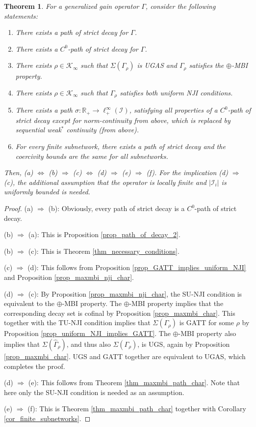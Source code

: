 \documentclass[10pt, oneside, a4paper]{article}
\newcommand{\R}{\mathbb{R}}
\newcommand{\IC}{\mathcal{I}}
\newcommand{\KC}{\mathcal{K}}
\newtheorem{theorem}{Theorem}[section]
\begin{document}
\begin{theorem}\label{thm_final}
For a generalized gain operator $\Gamma$, consider the following statements:%
\begin{enumerate}
\item[(a)] There exists a path of strict decay for $\Gamma$.%
\item[(b)] There exists a $C^0$-path of strict decay for $\Gamma$.%
\item[(c)] There exists $\rho \in \KC_{\infty}$ such that $\Sigma(\Gamma_{\rho})$ is UGAS and $\Gamma_{\rho}$ satisfies the $\oplus$-MBI property.%
\item[(d)] There exists $\rho \in \KC_{\infty}$ such that $\Gamma_{\rho}$ satisfies both uniform NJI conditions.%
\item[(e)] There exists a path $\sigma:\R_+ \rightarrow \ell^{\infty}_+(\IC)$, satisfying all properties of a $C^0$-path of strict decay except for norm-continuity from above, which is replaced by sequential weak$^*$ continuity (from above).%
\item[(f)] For every finite subnetwork, there exists a path of strict decay and the coercivity bounds are the same for all subnetworks.%
\end{enumerate}
Then, (a) $\Leftrightarrow$ (b) $\Rightarrow$ (c) $\Leftrightarrow$ (d) $\Rightarrow$ (e) $\Rightarrow$ (f). For the implication (d) $\Rightarrow$ (c), the additional assumption that the operator is locally finite and $|\IC_i|$ is uniformly bounded is needed.
\end{theorem}

\begin{proof}
(a) $\Rightarrow$ (b): Obviously, every path of strict decay is a $C^0$-path of strict decay.%

(b) $\Rightarrow$ (a): This is Proposition \ref{prop_path_of_decay_2}.%

(b) $\Rightarrow$ (c): This is Theorem \ref{thm_necessary_conditions}.%

(c) $\Rightarrow$ (d): This follows from Proposition \ref{prop_GATT_implies_uniform_NJI} and Proposition \ref{prop_maxmbi_nji_char}.%

(d) $\Rightarrow$ (c): By Proposition \ref{prop_maxmbi_nji_char}, the SU-NJI condition is equivalent to the $\oplus$-MBI property. The $\oplus$-MBI property implies that the corresponding decay set is cofinal by Proposition \ref{prop_maxmbi_char}. This together with the TU-NJI condition implies that $\Sigma(\Gamma_{\rho})$ is GATT for some $\rho$ by Proposition \ref{prop_uniform_NJI_implies_GATT}. The $\oplus$-MBI property also implies that $\Sigma(\hat{\Gamma}_{\rho})$, and thus also $\Sigma(\Gamma_{\rho})$, is UGS, again by Proposition \ref{prop_maxmbi_char}. UGS and GATT together are equivalent to UGAS, which completes the proof.%

(d) $\Rightarrow$ (e): This follows from Theorem \ref{thm_maxmbi_path_char}. Note that here only the SU-NJI condition is needed as an assumption.%

(e) $\Rightarrow$ (f): This is Theorem \ref{thm_maxmbi_path_char} together with Corollary \ref{cor_finite_subnetworks}.
\end{proof}
\end{document}
